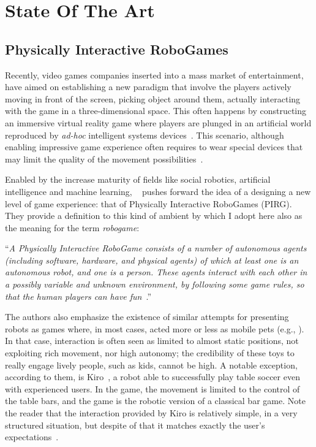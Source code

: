 \chapter{State Of The Art}\label{ch:art}

\section{Physically Interactive RoboGames}

Recently, video games companies inserted into a mass market of entertainment, have aimed on establishing a new paradigm that involve the players actively moving in front of the screen, picking object around them, actually interacting with the game in a three-dimensional space. This often happens by constructing an immersive virtual reality game where players are plunged in an artificial world reproduced by \textit{ad-hoc} intelligent systems devices~\cite{zyda_visual_2005}. This scenario, although enabling impressive game experience often requires to wear special devices that may limit the quality of the movement possibilities~\cite{martinoia_physically_2013}.

Enabled by the increase maturity of fields like social robotics, artificial intelligence and machine learning, ~\cite{martinoia_physically_2013} pushes forward the idea of a designing a new level of game experience: that of Physically Interactive RoboGames (PIRG). They provide a definition to this kind of ambient by which I adopt here also as the meaning for the term \textit{robogame}:

``\textit{A Physically Interactive RoboGame consists of a number of autonomous agents (including software, hardware, and physical agents) of which at least one is an autonomous robot, and one is a person. These agents interact with each other in a possibly variable and unknown environment, by following some game rules, so that the human players can have fun}~\cite{martinoia_physically_2013}.''

The authors also emphasize the existence of similar attempts for presenting robots as games where, in most cases, acted more or less as mobile pets (e.g., \cite{fujita_open_1997,shibata_emotional_1996}). In that case, interaction is often seen as limited to almost static positions, not exploiting rich movement, nor high autonomy; the credibility of these toys to really engage lively people, such as kids, cannot be high. A notable exception, according to them, is Kiro~\cite{weigel_kiro-table_2005}, a robot able to successfully play table soccer even with experienced users. In the game, the movement is limited to the control of the table bars, and the game is the robotic version of a classical bar game. Note the reader that the interaction provided by Kiro is relatively simple, in a very structured situation, but despite of that it matches exactly the user's expectations~\cite{martinoia_physically_2013}.

